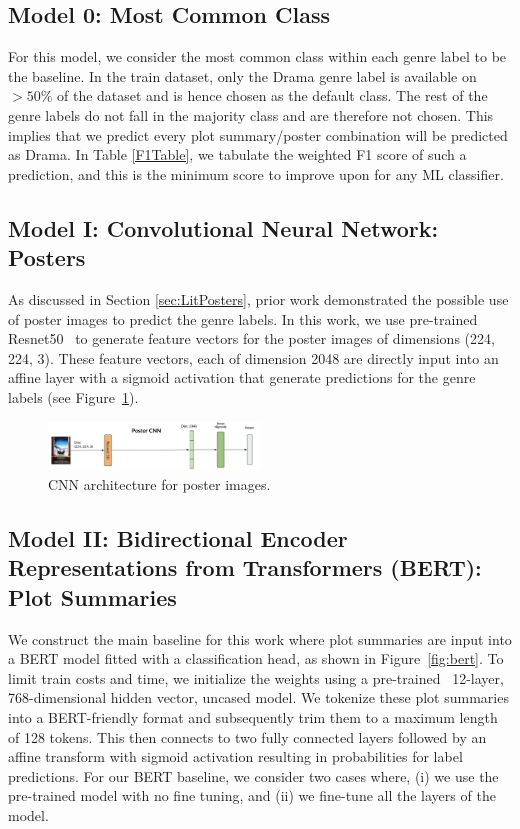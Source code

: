 \documentclass[10pt]{article}
\begin{document}
\subsection{Model 0: Most Common Class}
For this model, we consider the most common class within each genre label to be the baseline. In the train dataset, only the Drama genre label is available on $>50\%$ of the dataset and is hence chosen as the default class. The rest of the genre labels do not fall in the majority class and are therefore not chosen. This implies that we predict every plot summary/poster combination will be predicted as Drama. In Table \ref{F1Table}, we tabulate the weighted F1 score of such a prediction, and this is the minimum score to improve upon for any ML classifier. 

\subsection{Model I: Convolutional Neural Network: Posters}
As discussed in Section \ref{sec:LitPosters}, prior work demonstrated the possible use of poster images to predict the genre labels. In this work, we use pre-trained Resnet50~\cite{HeZRS15} to generate feature vectors for the poster images of dimensions (224, 224, 3). These feature vectors, each of dimension 2048 are directly input into an affine layer with a sigmoid activation that generate predictions for the genre labels (see Figure~\ref{fig:poster}).

\begin{figure}[!htb]
    \centering
    \includegraphics[width=0.5\textwidth]{images/Poster.png}
    \caption{CNN architecture for poster images.}
    \label{fig:poster}
\end{figure}

\subsection{Model II: Bidirectional Encoder Representations from Transformers (BERT): Plot Summaries}
We construct the main baseline for this work where plot summaries are input into a BERT model \cite{DevlinBERT} fitted with a classification head, as shown in Figure~\ref{fig:bert}. To limit train costs and time, we initialize the weights using a pre-trained~\cite{turc2019} 12-layer, 768-dimensional hidden vector, uncased model. We tokenize these plot summaries into a BERT-friendly format and subsequently trim them to a maximum length of 128 tokens. This then connects to two fully connected layers followed by an affine transform with sigmoid activation resulting in probabilities for label predictions. For our BERT baseline, we consider two cases where, (i) we use the pre-trained model with no fine tuning, and (ii) we fine-tune all the layers of the model.
\end{document}
